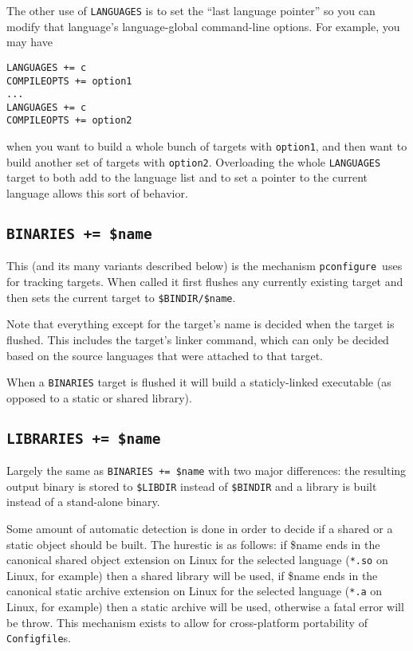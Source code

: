 \documentclass{article}
\newcommand{\pconfigure}{\texttt{pconfigure}}
\begin{document}
The other use of \texttt{LANGUAGES} is to set the ``last language
pointer'' so you can modify that language's language-global
command-line options.  For example, you may have
\begin{verbatim}
LANGUAGES += c
COMPILEOPTS += option1
...
LANGUAGES += c
COMPILEOPTS += option2
\end{verbatim}
when you want to build a whole bunch of targets with \texttt{option1},
and then want to build another set of targets with \texttt{option2}.
Overloading the whole \texttt{LANGUAGES} target to both add to the
language list and to set a pointer to the current language allows this
sort of behavior.

\subsection{\texttt{BINARIES += \$name} \label{cmd:binaries}}

This (and its many variants described below) is the mechanism
\pconfigure\ uses for tracking targets.  When called it first flushes
any currently existing target and then sets the current target to
\texttt{\$BINDIR/\$name}.

Note that everything except for the target's name is decided when the
target is flushed.  This includes the target's linker command, which
can only be decided based on the source languages that were attached
to that target.

When a \texttt{BINARIES} target is flushed it will build a
staticly-linked executable (as opposed to a static or shared library).

\subsection{\texttt{LIBRARIES += \$name} \label{cmd:libraries}}

Largely the same as \texttt{BINARIES += \$name} with two major
differences: the resulting output binary is stored to
\texttt{\$LIBDIR} instead of \texttt{\$BINDIR} and a library is built
instead of a stand-alone binary.

Some amount of automatic detection is done in order to decide if a
shared or a static object should be built.  The hurestic is as
follows: if \$name ends in the canonical shared object extension on
Linux for the selected language (\texttt{*.so} on Linux, for example)
then a shared library will be used, if \$name ends in the canonical
static archive extension on Linux for the selected language
(\texttt{*.a} on Linux, for example) then a static archive will be
used, otherwise a fatal error will be throw.  This mechanism exists to
allow for cross-platform portability of \texttt{Configfile}s.
\end{document}
